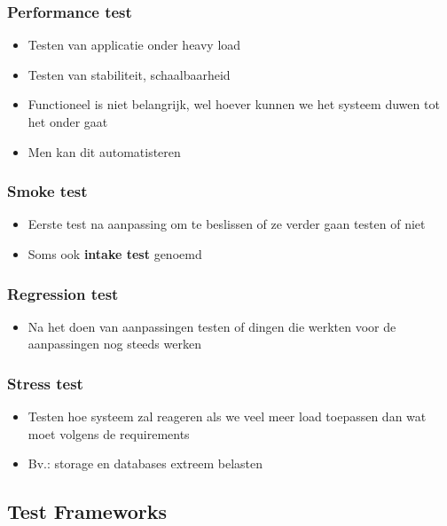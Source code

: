 \documentclass{article}
\begin{document}
\subsubsection{Performance test}

\begin{itemize}
    \item Testen van applicatie onder heavy load
    \item Testen van stabiliteit, schaalbaarheid
    \item Functioneel is niet belangrijk, wel hoever kunnen we het systeem duwen tot het onder gaat
    \item Men kan dit automatisteren
\end{itemize}

\subsubsection{Smoke test}

\begin{itemize}
    \item Eerste test na aanpassing om te beslissen of ze verder gaan testen of niet
    \item Soms ook \textbf{intake test} genoemd
\end{itemize}

\subsubsection{Regression test}

\begin{itemize}
    \item Na het doen van aanpassingen testen of dingen die werkten voor de aanpassingen nog steeds werken
\end{itemize}

\subsubsection{Stress test}

\begin{itemize}
    \item Testen hoe systeem zal reageren als we veel meer load toepassen dan wat moet volgens de requirements
    \item Bv.: storage en databases extreem belasten
\end{itemize}

\subsection{Test Frameworks}
\end{document}
